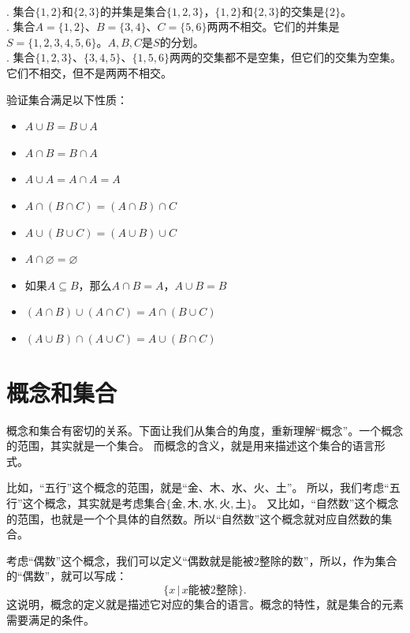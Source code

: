 \documentclass[12pt,UTF8,fontset=none]{ctexbook}
\begin{document}
\begin{ex}\label{ex:2-0-20}
    \mbox{} \\ 
    . 集合$\{1,2\}$和$\{2,3\}$的并集是集合$\{1,2,3\}$，$\{1,2\}$和$\{2,3\}$的交集是$\{2\}$。\\
    . 集合$A = \{1,2\}$、$B = \{3,4\}$、$C = \{5,6\}$两两不相交。它们的并集是$S = \{1,2,3,4,5,6\}$。$A,B,C$是$S$的分划。\\
    . 集合$ \{1,2,3\}$、$\{3,4,5\}$、$\{1,5,6\}$两两的交集都不是空集，但它们的交集为空集。它们不相交，但不是两两不相交。
\end{ex}

\begin{xt}\label{xt:2-1-0}
    验证集合满足以下性质：
    \begin{itemize}
        \item $A \cup B = B \cup A$
        \item $A \cap B = B \cap A$
        \item $A \cup A = A \cap A = A$
        \item $A \cap (B \cap C) = (A \cap B) \cap C$
        \item $A \cup (B \cup C) = (A \cup B) \cup C$
        \item $A \cap \varnothing = \varnothing$
        \item 如果$A \subseteq B$，那么$A \cap B = A$，$A \cup B = B$
        \item $(A \cap B) \cup (A \cap C) = A \cap (B \cup C)$
        \item $(A \cup B) \cap (A \cup C) = A \cup (B \cap C)$
    \end{itemize}  
\end{xt}

\section{概念和集合}

概念和集合有密切的关系。下面让我们从集合的角度，重新理解“概念”。一个概念的范围，其实就是一个集合。
而概念的含义，就是用来描述这个集合的语言形式。

比如，“五行”这个概念的范围，就是“金、木、水、火、土”。
所以，我们考虑“五行”这个概念，其实就是考虑集合$\{\mbox{金}, \mbox{木}, \mbox{水}, \mbox{火}, \mbox{土}\}$。
又比如，“自然数”这个概念的范围，也就是一个个具体的自然数。所以“自然数”这个概念就对应自然数的集合。

考虑“偶数”这个概念，我们可以定义“偶数就是能被$2$整除的数”，所以，作为集合的“偶数”，就可以写成：
$$ \{x \,|\,x \mbox{能被}2\mbox{整除} \}.$$
这说明，概念的定义就是描述它对应的集合的语言。概念的特性，就是集合的元素需要满足的条件。
\end{document}
